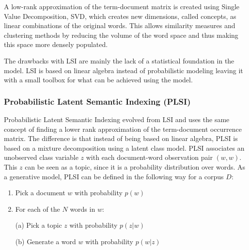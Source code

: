 \documentclass[12pt]{report}
\begin{document}
\vspace{3mm}

A low-rank approximation of the term-document matrix is created using Single Value Decomposition, SVD, which creates new dimensions, called concepts, as linear combinations of the original words. This allows similarity measures and clustering methods by reducing the volume of the word space and thus making this space more densely populated.\par

\vspace{3mm}

The drawbacks with LSI are mainly the lack of a statistical foundation in the model. LSI is based on linear algebra instead of probabilistic modeling leaving it with a small toolbox for what can be achieved using the model.\par
	

\vspace{10mm}
\subsubsection{Probabilistic Latent Semantic Indexing (PLSI)}
\vspace{5mm}

Probabilistic Latent Semantic Indexing evolved from LSI and uses the same concept of finding a lower rank approximation of the term-document occurrence matrix. The difference is that instead of being based on linear algebra, PLSI is based on a mixture decomposition using a latent class model. PLSI associates an unobserved class variable $z$ with each document-word observation pair $(w, w)$. This $z$ can be seen as a topic, since it is a probability distribution over words. As a generative model, PLSI can be defined in the following way for a corpus $D$:

\vspace{3mm}

\begin{enumerate}
\item Pick a document $w$ with probability $p(w)$
\item For each of the $N$ words in $w$:
\begin{itemize}
(a) Pick a topic $z$ with probability $p(z|w)$
\end{itemize}
\begin{itemize}
(b) Generate a word $w$ with probability $p(w|z)$
\end{itemize}
\end{enumerate}
\end{document}
